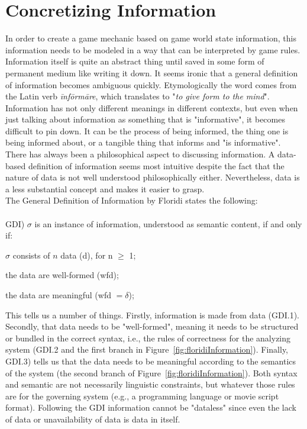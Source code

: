 \section{Concretizing Information}
\label{section:info}
In order to create a game mechanic based on game world state information, this information needs to be modeled in a way that can be interpreted by game rules. Information itself is quite an abstract thing until saved in some form of permanent medium like writing it down. It seems ironic that a general definition of information becomes ambiguous quickly. Etymologically the word comes from the Latin verb \textit{\={i}nf\={o}rm\={a}re}, which translates to "\textit{to give form to the mind}". Information has not only different meanings in different contexts, but even when just talking about information as something that is "informative", it becomes difficult to pin down. It can be the process of being informed, the thing one is being informed about, or a tangible thing that informs and "is informative".~\cite{Buckland1991}\\
There has always been a philosophical aspect to discussing information. A data-based definition of information seems most intuitive despite the fact that the nature of data is not well understood philosophically either. Nevertheless, data is a less substantial concept and makes it easier to grasp.\\
The General Definition of Information by Floridi states the following:\\\\
{GDI)} $\sigma$ is an instance of information, understood as semantic content, if and only if:\par
{} $\sigma$ consists of $n$ data (d), for n $\geq$ 1;\par
{} the data are well-formed (wfd);\par
{} the data are meaningful (wfd $= \delta$);\par
\vspace*{0.5cm}
This tells us a number of things. Firstly, information is made from data (GDI.1). Secondly, that data needs to be "well-formed", meaning it needs to be structured or bundled in the correct syntax, i.e., the rules of correctness for the analyzing system (GDI.2 and the first branch in Figure~\ref{fig:floridiInformation}). Finally, GDI.3) tells us that the data needs to be meaningful according to the semantics of the system (the second branch of Figure~\ref{fig:floridiInformation}). Both syntax and semantic are not necessarily linguistic constraints, but whatever those rules are for the governing system (e.g., a programming language or movie script format). Following the GDI information cannot be "dataless" since even the lack of data or unavailability of data is data in itself.~\cite{Floridi2010}\\
